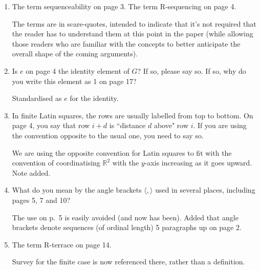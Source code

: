 \documentclass[12pt,a4paper]{article}
\newcommand{\R}{\mathbb{R}}
\newenvironment{QandA}{\begin{enumerate}[label=\bfseries\alph*.]\bfseries}
                      {\end{enumerate}}
\newenvironment{answered}{\par\normalfont}{}
\begin{document}
\begin{QandA}

\item
The term sequenceability on page 3.  The term R-sequencing on page 4.

\begin{answered}
The terms are in scare-quotes, intended to indicate that it's not required that the reader has to understand them at this point in the paper (while allowing those readers who are familiar with the concepts to better anticipate the overall shape of the coming arguments).
\end{answered}


\item 
Is $e$ on page 4 the identity element of $G$? If so, please say so. If so, why do you write this element as 1 on page 17?

\begin{answered}
Standardised as $e$ for the identity.
\end{answered}

\item
In finite Latin squares, the rows are usually labelled from top to bottom. On page 4, you say that row $i + d$ is ``distance $d$ above" row $i$. If you are using the convention opposite to the usual one, you need to say so.

\begin{answered}
We are using the opposite convention for Latin squares to fit with the convention of coordinatising $\R^2$ with the $y$-axis increasing as it goes upward.  Note added.
\end{answered}

\item
What do you mean by the angle brackets $\langle, \rangle$ used in several places, including pages 5, 7 and 10?

\begin{answered}
The use on p.~5 is easily avoided (and now has been).  Added that angle brackets denote sequences (of ordinal length) 5 paragraphs up on page 2.

\end{answered}

\item
The term R-terrace on page 14.

\begin{answered}
Survey for the finite case is now referenced there, 
rather than a definition.
\end{answered}

\end{QandA}
\end{document}
